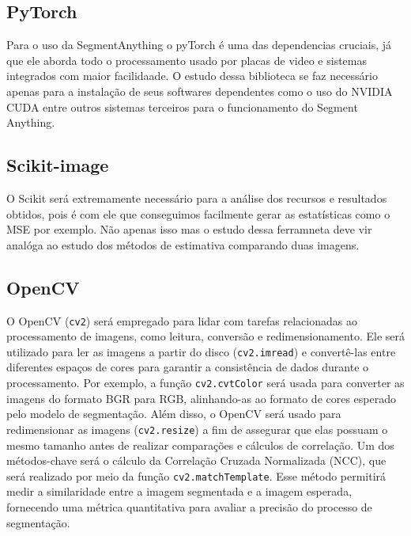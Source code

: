 \subsection{PyTorch}

Para o uso da SegmentAnything o pyTorch é uma das dependencias cruciais, já que ele aborda todo o processamento usado por placas de video e sistemas integrados com maior facilidaade. 
O estudo dessa biblioteca se faz necessário apenas para a instalação de seus softwares dependentes como o uso do NVIDIA CUDA entre outros sistemas terceiros para o funcionamento do Segment Anything.

\subsection{Scikit-image}

O Scikit será extremamente necessário para a análise dos recursos e resultados obtidos, pois é com ele que conseguimos facilmente gerar as estatísticas como o MSE por exemplo.
Não apenas isso mas o estudo dessa ferramneta deve vir analóga ao estudo dos métodos de estimativa comparando duas imagens.

\subsection{OpenCV}

O OpenCV (\texttt{cv2}) será empregado para lidar com tarefas relacionadas ao processamento de imagens, como leitura, conversão e redimensionamento.
Ele será utilizado para ler as imagens a partir do disco (\texttt{cv2.imread}) e convertê-las entre diferentes espaços de cores para garantir a consistência de dados durante o processamento. Por exemplo, a função \texttt{cv2.cvtColor} será usada para converter as imagens do formato BGR para RGB, alinhando-as ao formato de cores esperado pelo modelo de segmentação. Além disso, o OpenCV será usado para redimensionar as imagens (\texttt{cv2.resize}) a fim de assegurar que elas possuam o mesmo tamanho antes de realizar comparações e cálculos de correlação. Um dos métodos-chave será o cálculo da Correlação Cruzada Normalizada (NCC), que será realizado por meio da função \texttt{cv2.matchTemplate}. Esse método permitirá medir a similaridade entre a imagem segmentada e a imagem esperada, fornecendo uma métrica quantitativa para avaliar a precisão do processo de segmentação.

